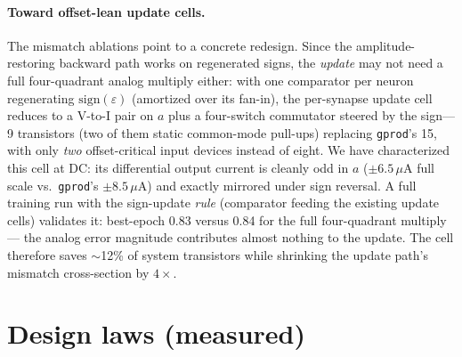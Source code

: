 \documentclass[11pt]{article}
\newcommand{\eps}{\varepsilon}
\begin{document}
\paragraph{Toward offset-lean update cells.} The mismatch ablations point to a concrete redesign. Since the amplitude-restoring backward path works on regenerated signs, the \emph{update} may not need a full four-quadrant analog multiply either: with one comparator per neuron regenerating $\mathrm{sign}(\eps)$ (amortized over its fan-in), the per-synapse update cell reduces to a V-to-I pair on $a$ plus a four-switch commutator steered by the sign---9 transistors (two of them static common-mode pull-ups) replacing \texttt{gprod}'s 15, with only \emph{two} offset-critical input devices instead of eight. We have characterized this cell at DC: its differential output current is cleanly odd in $a$ ($\pm6.5\,\mu$A full scale vs.\ \texttt{gprod}'s $\pm8.5\,\mu$A) and exactly mirrored under sign reversal. A full training run with the sign-update \emph{rule} (comparator feeding the existing update cells) validates it: best-epoch 0.83 versus 0.84 for the full four-quadrant multiply --- the analog error magnitude contributes almost nothing to the update. The cell therefore saves $\sim$12\% of system transistors while shrinking the update path's mismatch cross-section by $4\times$.

\section{Design laws (measured)}
\label{sec:laws}
\end{document}
